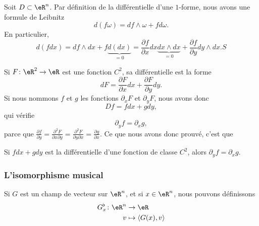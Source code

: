 Soit $D\subset\eR^n$. Par définition de la différentielle d'une $1$-forme, nous avons une formule de Leibnitz
\begin{equation}
    d(f\omega)=df\wedge\omega+fd\omega.
\end{equation}
En particulier,
\begin{equation}
    d(fdx)=df\wedge dx+f\underbrace{d(dx)}_{=0}=\frac{ \partial f }{ \partial x }dx\underbrace{dx\wedge dx}_{=0}+\frac{ \partial f }{ \partial y }dy\wedge dx. S
\end{equation}

Si $F\colon \eR^2\to \eR$ est une fonction $C^2$, sa différentielle est la forme
\begin{equation}
    dF=\frac{ \partial F }{ \partial x }dx+\frac{ \partial F }{ \partial y }dy.
\end{equation}
Si nous nommons $f$ et $g$ les fonctions $\partial_xF$ et $\partial_yF$, nous avons donc
\begin{equation}
    Df=fdx+gdy,
\end{equation}
qui vérifie
\begin{equation}
    \partial_yf=\partial_xg,
\end{equation}
parce que $\frac{ \partial f }{ \partial y }=\frac{ \partial^2F  }{ \partial x\partial y }=\frac{ \partial^2F  }{ \partial y\partial x }=\frac{ \partial g }{ \partial x }$. Ce que nous avons donc prouvé, c'est que 
\begin{lemma}
Si $fdx+gdy$ est la différentielle d'une fonction de classe $C^2$, alors $\partial_yf=\partial_xg$.
\end{lemma}

\subsubsection{L'isomorphisme musical}

Si $G$ est un champ de vecteur sur $\eR^n$, et si $x\in\eR^n$, nous pouvons définissons 
\begin{equation}		\label{EqDefBemol}
	\begin{aligned}[]
		G^{\flat}_x\colon \eR^n&\to \eR \\
			v&\mapsto \langle G(x), v\rangle 
	\end{aligned}
\end{equation}

